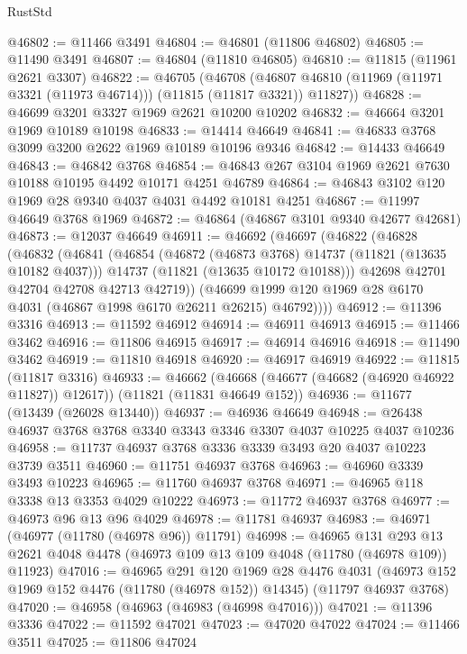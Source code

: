 \begin{lexlean}{RustStd}
\begin{coremodule}
@46802 := @11466 @3491
@46804 := @46801 (@11806 @46802)
@46805 := @11490 @3491
@46807 := @46804 (@11810 @46805)
@46810 := @11815 (@11961 @2621 @3307)
@46822 := @46705
    (@46708 (@46807 @46810 (@11969 (@11971 @3321 (@11973 @46714))) (@11815 (@11817 @3321)) @11827))
@46828 := @46699 @3201 @3327 @1969 @2621 @10200 @10202
@46832 := @46664 @3201 @1969 @10189 @10198
@46833 := @14414 @46649
@46841 := @46833 @3768 @3099 @3200 @2622 @1969 @10189 @10196 @9346
@46842 := @14433 @46649
@46843 := @46842 @3768
@46854 := @46843 @267 @3104 @1969 @2621 @7630 @10188 @10195 @4492 @10171 @4251 @46789
@46864 := @46843 @3102 @120 @1969 @28 @9340 @4037 @4031 @4492 @10181 @4251
@46867 := @11997 @46649 @3768 @1969
@46872 := @46864 (@46867 @3101 @9340 @42677 @42681)
@46873 := @12037 @46649
@46911 := @46692
    (@46697
      (@46822
        (@46828
          (@46832
            (@46841
              (@46854
                (@46872 (@46873 @3768) @14737 (@11821 (@13635 @10182 @4037)))
                @14737
                (@11821 (@13635 @10172 @10188)))
              @42698
              @42701
              @42704
              @42708
              @42713
              @42719))
          (@46699 @1999 @120 @1969 @28 @6170 @4031 (@46867 @1998 @6170 @26211 @26215) @46792))))
@46912 := @11396 @3316
@46913 := @11592 @46912
@46914 := @46911 @46913
@46915 := @11466 @3462
@46916 := @11806 @46915
@46917 := @46914 @46916
@46918 := @11490 @3462
@46919 := @11810 @46918
@46920 := @46917 @46919
@46922 := @11815 (@11817 @3316)
@46933 := @46662
    (@46668 (@46677 (@46682 (@46920 @46922 @11827)) @12617))
    (@11821 (@11831 @46649 @152))
@46936 := @11677 (@13439 (@26028 @13440))
@46937 := @46936 @46649
@46948 := @26438 @46937 @3768 @3768 @3340 @3343 @3346 @3307 @4037 @10225 @4037 @10236
@46958 := @11737 @46937 @3768 @3336 @3339 @3493 @20 @4037 @10223 @3739 @3511
@46960 := @11751 @46937 @3768
@46963 := @46960 @3339 @3493 @10223
@46965 := @11760 @46937 @3768
@46971 := @46965 @118 @3338 @13 @3353 @4029 @10222
@46973 := @11772 @46937 @3768
@46977 := @46973 @96 @13 @96 @4029
@46978 := @11781 @46937
@46983 := @46971 (@46977 (@11780 (@46978 @96)) @11791)
@46998 := @46965
    @131
    @293
    @13
    @2621
    @4048
    @4478
    (@46973 @109 @13 @109 @4048 (@11780 (@46978 @109)) @11923)
@47016 := @46965
    @291
    @120
    @1969
    @28
    @4476
    @4031
    (@46973 @152 @1969 @152 @4476 (@11780 (@46978 @152)) @14345)
    (@11797 @46937 @3768)
@47020 := @46958 (@46963 (@46983 (@46998 @47016)))
@47021 := @11396 @3336
@47022 := @11592 @47021
@47023 := @47020 @47022
@47024 := @11466 @3511
@47025 := @11806 @47024

\end{coremodule}
\end{lexlean}
